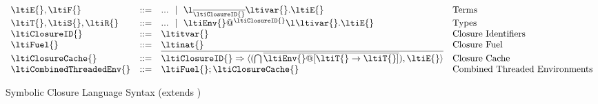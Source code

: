 \begin{figure}
$$
\begin{array}{lrll}
  \ltiE{}, \ltiF{} &::=& ... \alt
                         \ltiufunelab{\ova{\ltiufunelabentry{\ltiClosureID{}}}}
                                     {\ltivar{}}
                                     {\ltiE{}}
                      &\mbox{Terms} \\
  \ltiT{}, \ltiS{}, \ltiR{} &::=& ... \alt \ltiClosureWithStkID{\ltiEnv{}}{\ltiClosureID{}}{\ltiufun{\ltivar{}}{\ltiE{}}}
                      &\mbox{Types} \\
  \ltiClosureID{} &::=& \ltitvar{}
                      &\mbox{Closure Identifiers} \\
  \ltiFuel{} &::=& \ltinat{}
                      &\mbox{Closure Fuel} \\
  \ltiClosureCache{} &::=& \ova{\ltiClosureID{} \Rightarrow {\ltiClosureCacheVal{\ltiIFn
                                                                                 {\ova{\ltiContextualFn{\ltiEnv{}}{\ltiT{}}{\ltiT{}}}}}
                                                                                {\ltiE{}}}}
                      &\mbox{Closure Cache} \\
  \ltiCombinedThreadedEnv{} &::=& \ltimakeCombinedThreadedEnv{\ltiFuel{}}{\ltiClosureCache{}}
                      &\mbox{Combined Threaded Environments} \\
\end{array}
$$
\caption{Symbolic Closure Language Syntax (extends )}
\label{symbolic:figure:SC-language-syntax}
\end{figure}



